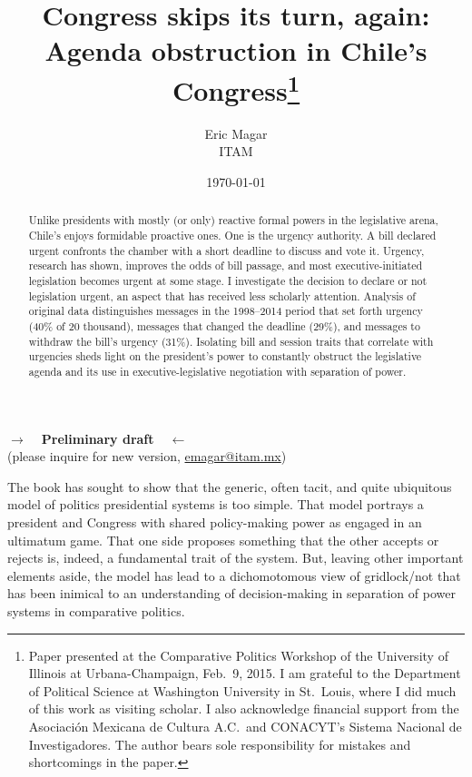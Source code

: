 \documentclass[letter,12pt]{article}
\begin{document}
\title{Congress skips its turn, again: \\ Agenda obstruction in Chile's Congress\thanks{Paper presented at the Comparative Politics Workshop of the University of Illinois at Urbana-Champaign, Feb.~9, 2015. I am grateful to the Department of Political Science at Washington University in St.\ Louis, where I did much of this work as visiting scholar. I also acknowledge financial support from the Asociaci\'on Mexicana de Cultura A.C.\ and CONACYT's Sistema Nacional de Investigadores. The author bears sole responsibility for mistakes and shortcomings in the paper.}}
\author{Eric Magar \\ ITAM }
\date{\today}
\maketitle

\begin{center} \textbf{$\rightarrow$~~Preliminary draft~~$\leftarrow$} \\ (please inquire for new version, \small{\url{emagar@itam.mx}})  \end{center}

\begin{abstract}
\noindent Unlike presidents with mostly (or only) reactive formal powers in the legislative arena, Chile's enjoys formidable proactive ones. One is the urgency authority. A bill declared urgent confronts the chamber with a short deadline to discuss and vote it. Urgency, research has shown, improves the odds of bill passage, and most executive-initiated legislation becomes urgent at some stage. I investigate the decision to declare or not legislation urgent, an aspect that has received less scholarly attention. Analysis of original data distinguishes messages in the 1998--2014 period that set forth urgency (40\% of 20 thousand), messages that changed the deadline (29\%), and messages to withdraw the bill's urgency (31\%). Isolating bill and session traits that correlate with urgencies sheds light on the president's power to constantly obstruct the legislative agenda and its use in executive-legislative negotiation with separation of power.  
\end{abstract}

\onehalfspacing

The book has sought to show that the generic, often tacit, and quite ubiquitous model of politics presidential systems is too simple. That model portrays a president and Congress with shared policy-making power as engaged in an ultimatum game. That one side proposes something that the other accepts or rejects is, indeed, a fundamental trait of the system. But, leaving other important elements aside, the model has lead to a dichomotomous view of gridlock/not that has been inimical to an understanding of decision-making in separation of power systems in comparative politics.
\end{document}
